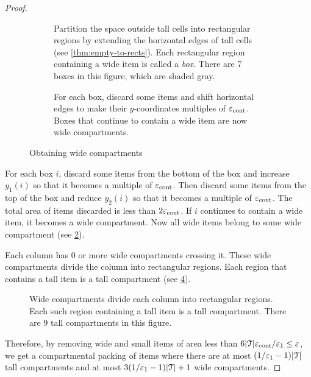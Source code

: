 \begin{proof}
\begin{figure}[!htb]
\begin{subfigure}[t]{0.45\textwidth}
\centering

\caption{Partition the space outside tall cells into rectangular regions by
extending the horizontal edges of tall cells (see \cref{thm:empty-to-rects}).
Each rectangular region containing a wide item is called a \emph{box}.
There are 7 boxes in this figure, which are shaded gray.}
\label{fig:compartmentalize:boxes}
\end{subfigure}
\hfill
\begin{subfigure}[t]{0.45\textwidth}
\centering

\caption{For each box, discard some items and shift horizontal edges
to make their $y$-coordinates multiples of $\varepsilon_{\mathrm{cont}}$.
Boxes that continue to contain a wide item are now wide compartments.}
\label{fig:compartmentalize:boxes2}
\end{subfigure}
\caption{Obtaining wide compartments}
\label{fig:compartmentalize-2}
\end{figure}

For each box $i$, discard some items from the bottom of the box
and increase $y_1(i)$ so that it becomes a multiple of $\varepsilon_{\mathrm{cont}}$.
Then discard some items from the top of the box
and reduce $y_2(i)$ so that it becomes a multiple of $\varepsilon_{\mathrm{cont}}$.
The total area of items discarded is less than $2\varepsilon_{\mathrm{cont}}$.
If $i$ continues to contain a wide item, it becomes a wide compartment.
Now all wide items belong to some wide compartment
(see \cref{fig:compartmentalize:boxes2}).

Each column has 0 or more wide compartments crossing it.
These wide compartments divide the column into rectangular regions.
Each region that contains a tall item is a tall compartment
(see \cref{fig:compartmentalize-3}).

\begin{figure}[!htb]
\centering

\caption[Obtaining tall compartments]%
{Wide compartments divide each column into rectangular regions.
Each such region containing a tall item is a tall compartment.
There are 9 tall compartments in this figure.}
\label{fig:compartmentalize-3}
\end{figure}

Therefore, by removing wide and small items of area less than
$6|\mathcal{T}|\varepsilon_{\mathrm{cont}}/\varepsilon_1 \le \varepsilon$, we get a compartmental packing of items
where there are at most $(1/\varepsilon_1-1)|\mathcal{T}|$ tall compartments
and at most $3(1/\varepsilon_1-1)|\mathcal{T}| + 1$ wide compartments.
\end{proof}

